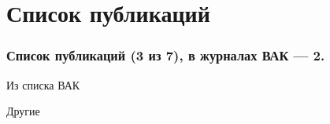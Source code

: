 
\section{Список публикаций}

\begin{frame}
\frametitle{Список публикаций (3 из 7), в журналах  ВАК --- 2.}
\nocite{*}
\begin{alertblock}{Из списка ВАК}
\printbibliography[keyword=VAK, title=Из списка ВАК]
\end{alertblock}
\begin{exampleblock}{Другие}
\printbibliography[keyword=NoVAK, title=Из списка ВАК]
\end{exampleblock}
\end{frame}
